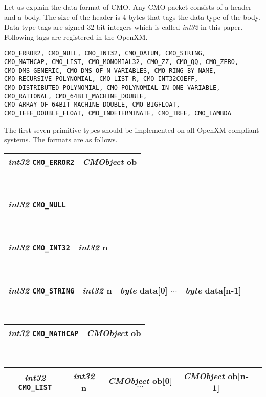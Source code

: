 Let us explain the data format of CMO.
Any CMO packet consists of a header and a body.
The size of the header is 4 bytes that tags the data type of the body.
Data type tags are signed 32 bit integers which is called {\sl int32} in this
paper.
Following tags are registered in the OpenXM.
\begin{verbatim}
CMO_ERROR2, CMO_NULL, CMO_INT32, CMO_DATUM, CMO_STRING,
CMO_MATHCAP, CMO_LIST, CMO_MONOMIAL32, CMO_ZZ, CMO_QQ, CMO_ZERO,
CMO_DMS_GENERIC, CMO_DMS_OF_N_VARIABLES, CMO_RING_BY_NAME,
CMO_RECURSIVE_POLYNOMIAL, CMO_LIST_R, CMO_INT32COEFF,
CMO_DISTRIBUTED_POLYNOMIAL, CMO_POLYNOMIAL_IN_ONE_VARIABLE,
CMO_RATIONAL, CMO_64BIT_MACHINE_DOUBLE,
CMO_ARRAY_OF_64BIT_MACHINE_DOUBLE, CMO_BIGFLOAT,
CMO_IEEE_DOUBLE_FLOAT, CMO_INDETERMINATE, CMO_TREE, CMO_LAMBDA
\end{verbatim}
The first seven primitive types should be implemented 
on all OpenXM compliant systems.
The formats are as follows. \\
\begin{tabular}{|c|c|}
\hline
{\sl int32} {\tt CMO\_ERROR2} & {\sl CMObject} {\rm ob} \\ 
\hline
\end{tabular} \\
\begin{tabular}{|c|c|}
\hline
{\sl int32} {\tt CMO\_NULL}  \\ 
\hline
\end{tabular} \\
\begin{tabular}{|c|c|}
\hline
{\sl int32} {\tt CMO\_INT32}& {\sl int32} {\rm n}  \\ 
\hline
\end{tabular} \\
\begin{tabular}{|c|c|c|c|c|}
\hline
{\sl int32} {\tt CMO\_STRING}& {\sl int32} {\rm n} & {\sl byte} {\rm data[0]} $\cdots$ & {\sl byte} {\rm data[n-1]} \\  \hline
\end{tabular} \\
\begin{tabular}{|c|c|}
\hline
{\sl int32} {\tt CMO\_MATHCAP} & {\sl CMObject} {\rm ob} \\ 
\hline
\end{tabular} \\
\begin{tabular}{|c|c|c|c|c|}
\hline
{\sl int32} {\tt CMO\_LIST}& {\sl int32} {\rm n} & {\sl CMObject} {\rm ob[0]} 
$\cdots$ & {\sl CMObject} {\rm ob[n-1]} \\  \hline
\end{tabular} \\

